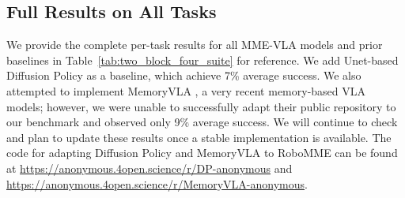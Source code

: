 \clearpage
\subsection{Full Results on All Tasks}
\label{sec:results_all_tasks}

We provide the complete per-task results for all MME-VLA models and prior baselines in Table~\ref{tab:two_block_four_suite} for reference. We add Unet-based Diffusion Policy \cite{chi2025diffusion} as a baseline, which achieve 7\% average success. 
We also attempted to implement MemoryVLA \cite{shi2025memoryvla}, a very recent memory-based VLA models; however, we were unable to successfully adapt their public repository to our benchmark and observed only 9\% average success. 
We will continue to check and plan to update these results once a stable implementation is available.
The code for adapting Diffusion Policy and MemoryVLA to RoboMME can be found at \url{https://anonymous.4open.science/r/DP-anonymous} and
\url{https://anonymous.4open.science/r/MemoryVLA-anonymous}.


